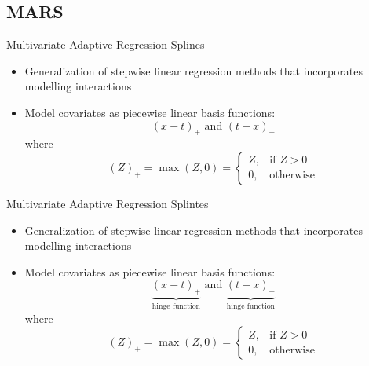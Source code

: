 \documentclass[handout]{beamer}
\begin{document}

\subsection{MARS} %
\label{ssub:mars}

\begin{frame}{Multivariate Adaptive Regression Splines}
  \begin{itemize}[<+->]
    \item Generalization of stepwise linear regression methods that incorporates modelling interactions
    \item Model covariates as piecewise linear basis functions:
  \begin{equation*} \label{eq:bases}
    (x - t)_{+} \text{ and } (t - x)_{+}
  \end{equation*} where
  \begin{equation*}
    (Z)_{+} = \max(Z, 0) = \begin{cases}
    Z, & \text{if } Z > 0 \\
    0, & \text{otherwise}
    \end{cases}
  \end{equation*}
  \end{itemize}
\end{frame}

\begin{frame}{Multivariate Adaptive Regression Splintes}
  \begin{itemize}
    \item Generalization of stepwise linear regression methods that incorporates modelling interactions
    \item Model covariates as piecewise linear basis functions:
  \begin{equation*} \label{eq:bases}
    \underbrace{(x - t)_{+}}_\text{hinge function} \text{ and } \underbrace{(t - x)_{+}}_\text{hinge function}
  \end{equation*} where
  \begin{equation*}
    (Z)_{+} = \max(Z, 0) = \begin{cases}
    Z, & \text{if } Z > 0 \\
    0, & \text{otherwise}
    \end{cases}
  \end{equation*}
  \end{itemize}
\end{frame}
\end{document}
